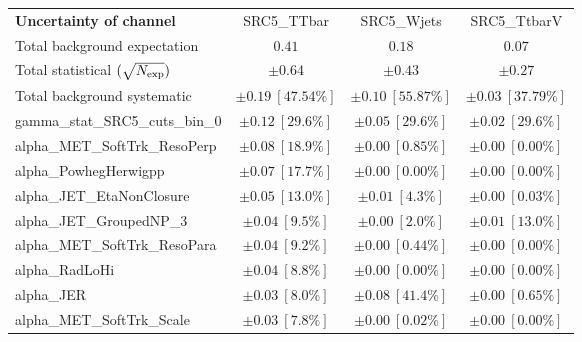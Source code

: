 
\begin{sidewaystable}
\begin{center}
\setlength{\tabcolsep}{0.0pc}
\begin{tabular*}{\textwidth}{@{\extracolsep{\fill}}lccc}
\noalign{\smallskip}\hline\noalign{\smallskip}
{\bf Uncertainty of channel}                                    & SRC5\_TTbar            & SRC5\_Wjets            & SRC5\_TtbarV            \\
\noalign{\smallskip}\hline\noalign{\smallskip}
Total background expectation             &  $0.41$        &  $0.18$        &  $0.07$       \\
\noalign{\smallskip}\hline\noalign{\smallskip}
Total statistical $(\sqrt{N_{\rm exp}})$              & $\pm 0.64$        & $\pm 0.43$        & $\pm 0.27$       \\
Total background systematic               & $\pm 0.19\ [47.54\%] $        & $\pm 0.10\ [55.87\%] $        & $\pm 0.03\ [37.79\%] $             \\
\noalign{\smallskip}\hline\noalign{\smallskip}
\noalign{\smallskip}\hline\noalign{\smallskip}
gamma\_stat\_SRC5\_cuts\_bin\_0         & $\pm 0.12\ [29.6\%] $          & $\pm 0.05\ [29.6\%] $          & $\pm 0.02\ [29.6\%] $       \\
alpha\_MET\_SoftTrk\_ResoPerp         & $\pm 0.08\ [18.9\%] $          & $\pm 0.00\ [0.85\%] $          & $\pm 0.00\ [0.00\%] $       \\
alpha\_PowhegHerwigpp         & $\pm 0.07\ [17.7\%] $          & $\pm 0.00\ [0.00\%] $          & $\pm 0.00\ [0.00\%] $       \\
alpha\_JET\_EtaNonClosure         & $\pm 0.05\ [13.0\%] $          & $\pm 0.01\ [4.3\%] $          & $\pm 0.00\ [0.03\%] $       \\
alpha\_JET\_GroupedNP\_3         & $\pm 0.04\ [9.5\%] $          & $\pm 0.00\ [2.0\%] $          & $\pm 0.01\ [13.0\%] $       \\
alpha\_MET\_SoftTrk\_ResoPara         & $\pm 0.04\ [9.2\%] $          & $\pm 0.00\ [0.44\%] $          & $\pm 0.00\ [0.00\%] $       \\
alpha\_RadLoHi         & $\pm 0.04\ [8.8\%] $          & $\pm 0.00\ [0.00\%] $          & $\pm 0.00\ [0.00\%] $       \\
alpha\_JER         & $\pm 0.03\ [8.0\%] $          & $\pm 0.08\ [41.4\%] $          & $\pm 0.00\ [0.65\%] $       \\
alpha\_MET\_SoftTrk\_Scale         & $\pm 0.03\ [7.8\%] $          & $\pm 0.00\ [0.02\%] $          & $\pm 0.00\ [0.00\%] $       \\

\end{tabular*}
\end{center}
\end{sidewaystable}
